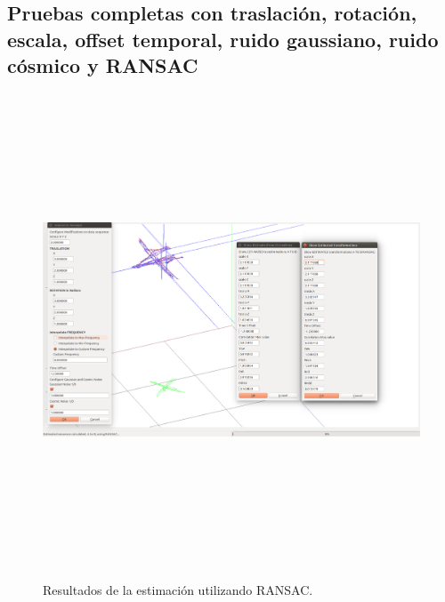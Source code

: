 \subsection{Pruebas completas con traslación, rotación, escala, offset temporal, ruido gaussiano, ruido cósmico y RANSAC}







\begin{figure}[H]
\begin{center}
\label{fig:opciones de View}\includegraphics[height=14.0cm,width=18.0cm]{img/cap6/RANSAC_ScaleTraslaRotaGausCosmicNoise_ab.png}
\hspace{0.5cm}

\end{center}

\caption{Resultados de la estimación  utilizando RANSAC.}
\end{figure}

